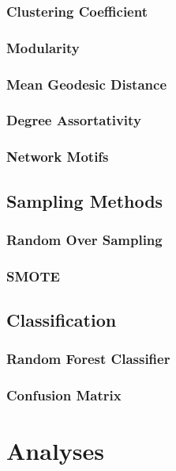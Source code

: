 \documentclass{article}
\begin{document}
		\subsubsection{Clustering Coefficient}
		\subsubsection{Modularity}
		\subsubsection{Mean Geodesic Distance}
		\subsubsection{Degree Assortativity}
		\subsubsection{Network Motifs}

	\subsection{Sampling Methods}
		\subsubsection{Random Over Sampling}
		\subsubsection{SMOTE}
	
	\subsection{Classification}
		\subsubsection{Random Forest Classifier}
		\subsubsection{Confusion Matrix}
		\subsubsection{}
		
	\subsection{}

\section{Analyses}
\subsection{}
\end{document}
